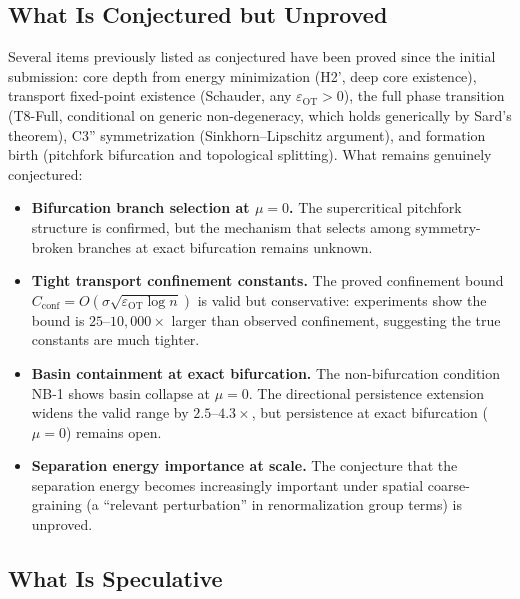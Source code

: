 \documentclass[lettersize,journal]{IEEEtran}
\begin{document}
\subsection{What Is Conjectured but Unproved}

Several items previously listed as conjectured have been proved since the initial submission: core depth from energy minimization (H2', deep core existence), transport fixed-point existence (Schauder, any $\varepsilon_{\mathrm{OT}} > 0$), the full phase transition (T8-Full, conditional on generic non-degeneracy, which holds generically by Sard's theorem), C3'' symmetrization (Sinkhorn--Lipschitz argument), and formation birth (pitchfork bifurcation and topological splitting). What remains genuinely conjectured:

\begin{itemize}
\item \textbf{Bifurcation branch selection at $\mu = 0$.} The supercritical pitchfork structure is confirmed, but the mechanism that selects among symmetry-broken branches at exact bifurcation remains unknown.

\item \textbf{Tight transport confinement constants.} The proved confinement bound $C_{\mathrm{conf}} = O(\sigma \sqrt{\varepsilon_{\mathrm{OT}} \log n})$ is valid but conservative: experiments show the bound is $25$--$10{,}000\times$ larger than observed confinement, suggesting the true constants are much tighter.

\item \textbf{Basin containment at exact bifurcation.} The non-bifurcation condition NB-1 shows basin collapse at $\mu = 0$. The directional persistence extension widens the valid range by $2.5$--$4.3\times$, but persistence at exact bifurcation ($\mu = 0$) remains open.

\item \textbf{Separation energy importance at scale.} The conjecture that the separation energy becomes increasingly important under spatial coarse-graining (a ``relevant perturbation'' in renormalization group terms) is unproved.
\end{itemize}

\subsection{What Is Speculative}
\end{document}
